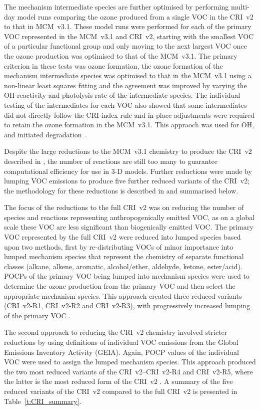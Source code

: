 The mechanism intermediate species are further optimised by performing multi-day model runs comparing the ozone produced from a single VOC in the CRI~v2 to that in MCM~v3.1.
These model runs were performed for each of the primary VOC represented in the MCM~v3.1 and CRI~v2, starting with the smallest VOC of a particular functional group and only moving to the next largest VOC once the ozone production was optimised to that of the MCM~v3.1.
The primary criterion in these tests was ozone formation, the ozone formation of the mechanism intermediate species was optimised to that in the MCM~v3.1 using a non-linear least squares fitting and the agreement was improved by varying the OH-reactivity and photolysis rate of the intermediate species.
The individual testing of the intermediates for each VOC also showed that some intermediates did not directly follow the CRI-index rule and in-place adjustments were required to retain the ozone formation in the MCM~v3.1.
This appraoch was used for OH,  and  initiated degradation \citep{Jenkin:2008}.

Despite the large reductions to the MCM~v3.1 chemistry to produce the CRI~v2 described in \citet{Jenkin:2008}, the number of reactions are still too many to guarantee computational efficiency for use in 3-D models.
Further reductions were made by lumping VOC emissions to produce five further reduced variants of the CRI~v2; the methodology for these reductions is described in \citet{Watson:2008} and summarised below.

The focus of the reductions to the full CRI~v2 was on reducing the number of species and reactions representing anthropogenically emitted VOC, as on a global scale these VOC are less significant than biogenically emitted VOC.
The primary VOC represented by the full CRI~v2 were reduced into lumped species based upon two methods, first by re-distributing VOCs of minor importance into lumped mechanism species that represent the chemistry of separate functional classes (alkane, alkene, aromatic, alcohol/ether, aldehyde, ketone, ester/acid).
POCPs of the primary VOC being lumped into mechanism species were used to determine the ozone production from the primary VOC and then select the appropriate mechanism species.
This approach created three reduced variants (CRI~v2-R1, CRI~v2-R2 and CRI~v2-R3), with progressively increased lumping of the primary VOC \citep{Watson:2008}.

The second approach to reducing the CRI~v2 chemistry involved stricter reductions by using definitions of individual VOC emissions from the Global Emissions Inventory Activity (GEIA).
Again, POCP values of the individual VOC were used to assign the lumped mechanism species.
This approach produced the two most reduced variants of the CRI~v2--CRI~v2-R4 and CRI~v2-R5, where the latter is the most reduced form of the CRI~v2 \citep{Watson:2008}.
A summary of the five reduced variants of the CRI~v2 compared to the full CRI~v2 is presented in Table~\ref{t:CRI_summary}.

